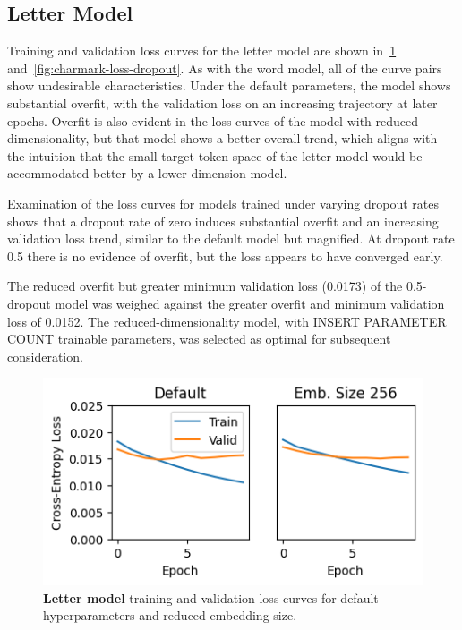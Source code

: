 \documentclass[letterpaper]{article} %
\begin{document}
\begin{NoHyper}
\subsection{Letter Model}
\label{subsec:letter}

Training and validation loss curves for the letter model are shown in~\ref{fig:charmark-loss-df} and~\ref{fig:charmark-loss-dropout}.
As with the word model, all of the curve pairs show undesirable characteristics.
Under the default parameters, the model shows substantial overfit, with the validation loss on an increasing trajectory at later epochs.
Overfit is also evident in the loss curves of the model with reduced dimensionality, but that model shows a better overall trend, which aligns with the intuition that the small target token space of the letter model would be accommodated better by a lower-dimension model.

Examination of the loss curves for models trained under varying dropout rates shows that a dropout rate of zero induces substantial overfit and an increasing validation loss trend, similar to the default model but magnified.
At dropout rate 0.5 there is no evidence of overfit, but the loss appears to have converged early.

The reduced overfit but greater minimum validation loss (0.0173) of the 0.5-dropout model was weighed against the greater overfit and minimum validation loss of 0.0152.
The reduced-dimensionality model, with INSERT PARAMETER COUNT trainable parameters, was selected as optimal for subsequent consideration.

\begin{figure}
\centering
\includegraphics[width=0.9\columnwidth]{fig-charmark-loss-default-and-embsize}
\caption{\textbf{Letter model} training and validation loss curves for default hyperparameters and reduced embedding size.}
\label{fig:charmark-loss-df}
\end{figure}


\end{NoHyper}
\end{document}

